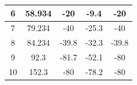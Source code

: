 \documentclass[UTF8,10pt,a4paper,fontset=fandol]{ctexart}
\newcommand{\fieldvalue}[1]{#1}
\begin{document}
\begin{center}
\begin{tabular}{|c|c|c|c|c|}
\hline
6 &
\fieldvalue{58.934} &
\fieldvalue{-20} &
\fieldvalue{-9.4} &
\fieldvalue{-20}\\
\hline
7 &
\fieldvalue{79.234} &
\fieldvalue{-40} &
\fieldvalue{-25.3} &
\fieldvalue{-40}\\
\hline
8 &
\fieldvalue{84.234} &
\fieldvalue{-39.8} &
\fieldvalue{-32.3} &
\fieldvalue{-39.8}\\
\hline
9 &
\fieldvalue{92.3} &
\fieldvalue{-81.7} &
\fieldvalue{-52.1} &
\fieldvalue{-80}\\
\hline
10 &
\fieldvalue{152.3} &
\fieldvalue{-80} &
\fieldvalue{-78.2} &
\fieldvalue{-80}\\
\hline
\end{tabular}
\end{center}
\end{document}
